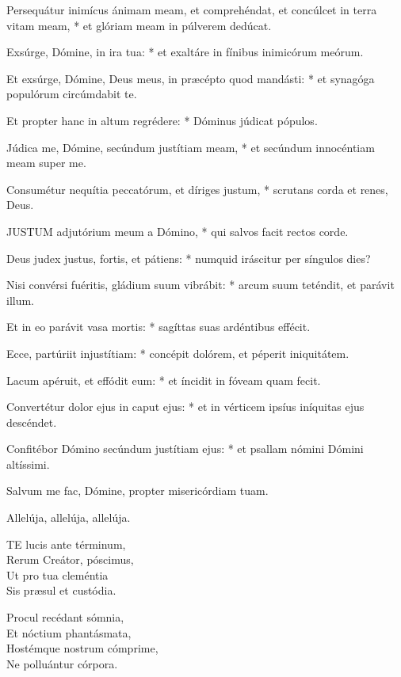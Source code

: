 Persequátur inimícus ánimam meam, et comprehéndat, et concúlcet in terra vitam meam, * et glóriam meam in púlverem dedúcat.

Exsúrge, Dómine, in ira tua: * et exaltáre in fínibus inimicórum meórum.

Et exsúrge, Dómine, Deus meus, in præcépto quod mandásti: * et synagóga populórum circúmdabit te.

Et propter hanc in altum regrédere: * Dóminus júdicat pópulos.

Júdica me, Dómine, secúndum justítiam meam, * et secúndum innocéntiam meam super me.

Consumétur nequítia peccatórum, et díriges justum, * scrutans corda et renes, Deus.


\lettrine[lines=2]{J}{USTUM} adjutórium meum a Dómino, * qui salvos facit rectos corde.

Deus judex justus, fortis, et pátiens: * numquid iráscitur per síngulos dies?

Nisi convérsi fuéritis, gládium suum vibrábit: * arcum suum teténdit, et parávit illum.

Et in eo parávit vasa mortis: * sagíttas suas ardéntibus effécit.

Ecce, partúriit injustítiam: * concépit dolórem, et péperit iniquitátem.

Lacum apéruit, et effódit eum: * et íncidit in fóveam quam fecit.

Convertétur dolor ejus in caput ejus: * et in vérticem ipsíus iníquitas ejus descéndet.

Confitébor Dómino secúndum justítiam ejus: * et psallam nómini Dómini altíssimi.

  Salvum me fac, Dómine, propter misericórdiam tuam.


 Allelúja, allelúja, allelúja.


\lettrine[lines=2]{T}{E} lucis ante términum,\\
Rerum Creátor, póscimus,\\
Ut pro tua cleméntia\\
Sis præsul et custódia.

Procul recédant sómnia,\\
Et nóctium phantásmata,\\
Hostémque nostrum cómprime,\\
Ne polluántur córpora.


